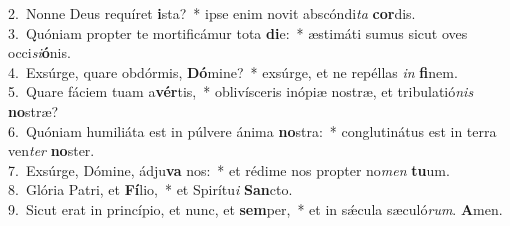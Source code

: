 {2.~}Nonne Deus requíret \textbf{i}sta?~* ipse enim novit abscóndi\textit{ta} \textbf{cor}dis.\\
{3.~}Quóniam propter te mortificámur tota \textbf{di}e:~* æstimáti sumus sicut oves occi\textit{si}\textbf{ó}nis.\\
{4.~}Exsúrge, quare obdórmis, \textbf{Dó}mine?~* exsúrge, et ne repéllas \textit{in} \textbf{fi}nem.\\
{5.~}Quare fáciem tuam a\textbf{vér}tis,~* oblivísceris inópiæ nostræ, et tribulatió\textit{nis} \textbf{no}stræ?\\
{6.~}Quóniam humiliáta est in púlvere ánima \textbf{no}stra:~* conglutinátus est in terra ven\textit{ter} \textbf{no}ster.\\
{7.~}Exsúrge, Dómine, ádju\textbf{va} nos:~* et rédime nos propter no\textit{men} \textbf{tu}um.\\
{8.~}Glória Patri, et \textbf{Fí}lio,~* et Spirítu\textit{i} \textbf{San}cto.\\
{9.~}Sicut erat in princípio, et nunc, et \textbf{sem}per,~* et in sǽcula sæculó\textit{rum}. \textbf{A}men.\\
